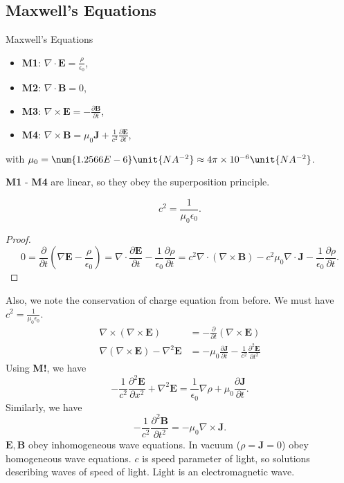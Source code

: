 \subsection{Maxwell's Equations}
\leavevmode
\begin{theorem}{Maxwell's Equations}{}
    \leavevmode
    \begin{itemize}
        \item \textbf{M1}: \(\nabla \cdot \mathbf{E}  = \frac{\rho}{\epsilon_0}\),
        \item \textbf{M2}: \(\nabla \cdot \mathbf{B}  = 0\),
        \item \textbf{M3}: \(\nabla \times \mathbf{E} = - \frac{\partial \mathbf{B}}{\partial t} \),
        \item \textbf{M4}: \(\nabla \times \mathbf{B} = \mu_0 \mathbf{J} + \frac{1}{c^2} \frac{\partial \mathbf{E} }{\partial t}\),
    \end{itemize}
    with \(\mu_0 = \num{1.2566E-6}\unit{NA^{-2}}\approx 4\pi\times 10^{-6}\unit{NA^{-2}}\).
\end{theorem}
\begin{remark}
    \textbf{M1} - \textbf{M4} are linear, so they obey the superposition principle.
\end{remark}
\begin{proposition}{}{}
    \leavevmode
    \[
        c^2 = \frac{1}{\mu_0\epsilon_0}.
    \]
\end{proposition}
\begin{proof}
    \[
        0 = \frac{\partial }{\partial t} (\nabla \mathbf{E} - \frac{\rho}{\epsilon_0}) = \nabla \cdot \frac{\partial \mathbf{E} }{\partial t} - \frac{1}{\epsilon_0}\frac{\partial \rho}{\partial t} = c^2 \nabla  \cdot (\nabla  \times \mathbf{B} )-c^2\mu_{0}\nabla \cdot \mathbf{J} -\frac{1}{\epsilon_0}\frac{\partial \rho}{\partial t} .
    \]
\end{proof}
Also, we note the conservation of charge equation from before. We must have \(c^2 = \frac{1}{\mu_0 \epsilon_0}\).
\begin{align*}
    \nabla \times (\nabla \times \mathbf{E} ) &= - \frac{\partial }{\partial t} (\nabla \times \mathbf{E} )\\
    \nabla (\nabla\times \mathbf{E}) - \nabla ^2 \mathbf{E}  &= - \mu_0 \frac{\partial \mathbf{J}}{\partial t} - \frac{1}{c^2}\frac{\partial^2 \mathbf{E} }{\partial t^2}  
\end{align*}
Using \textbf{M!}, we have
\[
    -\frac{1}{c^{2}}\frac{\partial^2\mathbf{E}}{\partial x^2} +\nabla ^2 \mathbf{E} =\frac{1}{\epsilon_0}\nabla \rho + \mu_0 \frac{\partial \mathbf{J}}{\partial t} .
\] 
Similarly, we have
\[
    -\frac{1}{c^2}\frac{\partial^2 \mathbf{B}}{\partial t^2} = - \mu_0 \nabla \times \mathbf{J} .
\]
\(\mathbf{E},\mathbf{B} \) obey inhomogeneous wave equations. In vacuum (\(\rho = \mathbf{J} = 0\)) obey homogeneous wave equations. \(c\) is speed parameter of light, so solutions describing waves of speed of light. Light is an electromagnetic wave.
